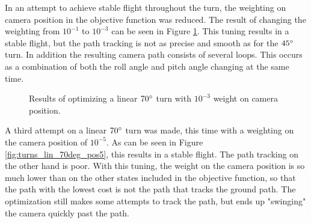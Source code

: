 In an attempt to achieve stable flight throughout the turn, the weighting on camera position in the objective function was reduced. The result of changing the weighting from $10^{-1}$ to $10^{-3}$ can be seen in Figure \ref{fig:turns_lin_70deg_pos3}. This tuning results in a stable flight, but the path tracking is not as precise and smooth as for the $45\degree$ turn. In addition the resulting camera path consists of several loops. This occurs as a combination of both the roll angle and pitch angle changing at the same time.

\begin{figure}
	\caption{Results of optimizing a linear $70\degree$ turn with $10^{-3}$ weight on camera position.}
	\label{fig:turns_lin_70deg_pos3}
\end{figure}

A third attempt on a linear $70\degree$ turn was made, this time with a weighting on the camera position of $10^{-5}$. As can be seen in Figure \ref{fig:turns_lin_70deg_pos5}, this results in a stable flight. The path tracking on the other hand is poor. With this tuning, the weight on the camera position is so much lower than on the other states included in the objective function, so that the path with the lowest cost is not the path that tracks the ground path. The optimization still makes some attempts to track the path, but ends up "swinging" the camera quickly past the path.

